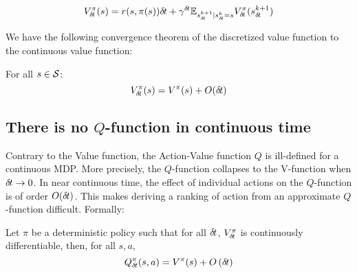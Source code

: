 \begin{equation}
  \label{eq:bellman}
  V^\pi_{\delta\hspace{-.1em}t}(s) = {r}(s, \pi(s)){\delta\hspace{-.1em}t} + \gamma^{{\delta\hspace{-.1em}t}} \mathbb{E}_{s_{{\delta\hspace{-.1em}t}}^{k+1} | s_{{\delta\hspace{-.1em}t}}^{k} = s} V^\pi_{\delta\hspace{-.1em}t}(s_{{\delta\hspace{-.1em}t}}^{k+1})
\end{equation}

We have the following convergence theorem of the discretized value function to the continuous value function:
  \begin{theorem}
   For all $s \in {\cal S}$:
    \begin{equation}
      \label{eq:conv-value}
      V^\pi_{\delta\hspace{-.1em}t}(s) = V^\pi(s) + O({\delta\hspace{-.1em}t})
    \end{equation}
    \label{th:conv-value}
  \end{theorem}


\subsection{There is no $Q$-function in continuous time}

Contrary to the Value function, the Action-Value function $Q$ is ill-defined
for a continuous MDP. More precisely, the $Q$-function  collapses to the
V-function when ${\delta\hspace{-.1em}t} \rightarrow 0$. In near continuous time, the effect of
individual actions on the $Q$-function is of order $O({\delta\hspace{-.1em}t})$. This makes
deriving a ranking of action from an approximate $Q$-function difficult.
Formally:
\begin{theorem}
Let $\pi$ be a deterministic policy such that for all ${\delta\hspace{-.1em}t}$, $V^\pi_{\delta\hspace{-.1em}t}$ is continuously
differentiable, then, for all $s, a$,
\begin{equation}
	\label{eq:q-discr}
	Q^\pi_{\delta\hspace{-.1em}t}(s, a) = V^\pi(s) + O\left({\delta\hspace{-.1em}t}\right)
\end{equation}

  \label{th:q-cont}
\end{theorem}

